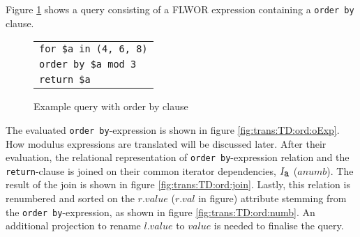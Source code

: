 \begin{myExample}
Figure \ref{fig:trans:TD:ordQu} shows a query consisting of a FLWOR expression containing a \texttt{order by} clause.
\begin{figure}[h]
\centering
\begin{tabular}{l}
\texttt{for \$a in (4, 6, 8)} \\
\texttt{order by \$a mod 3}\\
\texttt{return \$a}\\
\end{tabular}
\label{fig:trans:TD:ordQu}
\caption{Example query with order by clause}
\end{figure}

The evaluated \texttt{order by}-expression is shown in figure \ref{fig:trans:TD:ord:oExp}. How modulus expressions
are translated will be discussed later. After their evaluation, the relational representation of \texttt{order
by}-expression relation and the \texttt{return}-clause is joined on their common iterator dependencies,
$I_{\mbox{\texttt{a}}}$ ($anumb$). The result of the join is shown in figure \ref{fig:trans:TD:ord:join}. Lastly,
this relation is renumbered and sorted on the $r.value$ ($r.val$ in figure) attribute stemming from the
\texttt{order by}-expression, as shown in figure \ref{fig:trans:TD:ord:numb}. An additional projection to rename
$l.value$ to $value$ is needed to finalise the query.

\begin{figure}[h]
\centering
{}
\qquad
{}
\qquad
{}



\end{figure}
\end{myExample}
